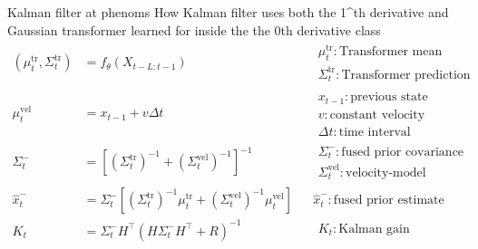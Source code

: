 \begin{frame}{Kalman filter at phenoms}
    How Kalman filter uses both the 1^{th} derivative and Gaussian transformer learned for inside the the 0th derivative class
    \[
        \begin{aligned}
        (\mu^{\mathrm{tr}}_{t},\Sigma^{\mathrm{tr}}_{t})
            &=
            f_{\theta}(X_{t-L:t-1})
            &&
            \begin{array}{l}
                \mu^{\mathrm{tr}}_{t}: \text{Transformer mean prediction} \\
                \Sigma^{\mathrm{tr}}_{t}: \text{Transformer prediction covariance}
            \end{array}
            \\[8pt]
            \mu^{\mathrm{vel}}_{t}
            &=
            x_{t-1}
            +
            v\Delta t
            &&
            \begin{array}{l}
                x_{t-1}: \text{previous state} \\
                v: \text{constant velocity} \\
                \Delta t: \text{time interval}
            \end{array}
            \\[8pt]
            \Sigma^{-}_{t}
            &=
            \left[
                (\Sigma^{\mathrm{tr}}_{t})^{-1}
                +
                (\Sigma^{\mathrm{vel}}_{t})^{-1}
            \right]^{-1}
            &&
            \begin{array}{l}
                \Sigma^{-}_{t}: \text{fused prior covariance} \\
                \Sigma^{\mathrm{vel}}_{t}: \text{velocity-model covariance}
            \end{array}
            \\[8pt]
            \hat{x}^{-}_{t}
            &=
            \Sigma^{-}_{t}
            \left[
                (\Sigma^{\mathrm{tr}}_{t})^{-1}\mu^{\mathrm{tr}}_{t}
                +
                (\Sigma^{\mathrm{vel}}_{t})^{-1}\mu^{\mathrm{vel}}_{t}
            \right]
            &&
            \hat{x}^{-}_{t}: \text{fused prior estimate}
            \\[8pt]
            K_{t}
            &=
            \Sigma^{-}_{t}H^{\top}
            \left(
                H\Sigma^{-}_{t}H^{\top}
                +
                R
            \right)^{-1}
            &&
            \begin{array}{l}
                K_{t}: \text{Kalman gain} \\

\end{array}
\end{aligned}\]
\end{frame}
